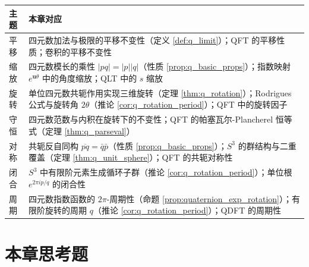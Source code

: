 \begin{center}
\renewcommand{\arraystretch}{1.3}
\begin{tabular}{>{\centering\arraybackslash}p{2.2cm}>{\centering\arraybackslash}p{10.5cm}}
\toprule
主题 & 本章对应 \\
\midrule
平移 & 四元数加法与极限的平移不变性（定义 \ref{def:q_limit}）；QFT 的平移性质；卷积的平移不变性 \\
缩放 & 四元数模长的乘性 $|pq|=|p||q|$（性质 \ref{prop:q_basic_props}）；指数映射 $e^{\mathbf{u}\theta}$ 中的角度缩放；QLT 中的 $s$ 缩放 \\
旋转 & 单位四元数共轭作用实现三维旋转（定理 \ref{thm:q_rotation}）；Rodrigues 公式与旋转角 $2\theta$（推论 \ref{cor:q_rotation_period}）；QFT 中的旋转因子 \\
守恒 & 四元数范数与内积在旋转下的不变性；QFT 的帕塞瓦尔-Plancherel 恒等式（定理 \ref{thm:q_parseval}） \\
对称 & 共轭反自同构 $\overline{pq}=\bar q\bar p$（性质 \ref{prop:q_basic_props}）；$S^3$ 的群结构与二重覆盖（定理 \ref{thm:q_unit_sphere}）；QFT 的共轭对称性 \\
闭合 & $S^3$ 中有限阶元素生成循环子群（推论 \ref{cor:q_rotation_period}）；单位根 $e^{2\pi i p/q}$ 的闭合性 \\
周期 & 四元数指数函数的 $2\pi$-周期性（命题 \ref{prop:quaternion_exp_rotation}）；有限阶旋转的周期 $q$（推论 \ref{cor:q_rotation_period}）；QDFT 的周期性 \\
\bottomrule
\end{tabular}
\end{center}

\section*{本章思考题}

